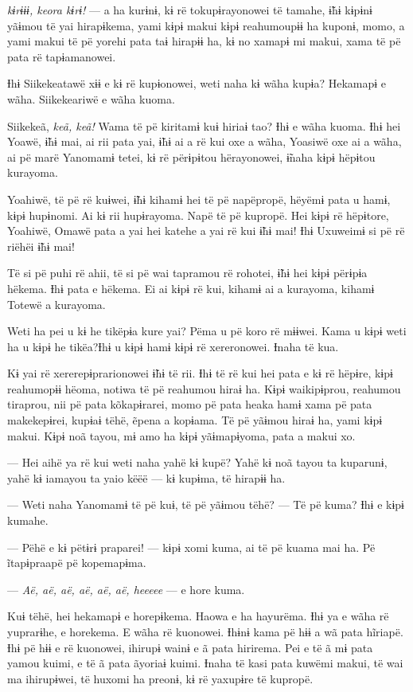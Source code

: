  \textit{kɨrɨɨɨ, keora kɨrɨ!} --- a ha kurɨnɨ, kɨ rë tokupɨrayonowei të
tamahe, ɨ̃hɨ kɨpɨnɨ yãɨmou të yai hirapɨkema, yami kɨpɨ makui kɨpɨ
reahumoupɨɨ ha kuponɨ, momo, a yami makui të pë yorehi pata taɨ hirapɨɨ
ha, kɨ no xamapɨ mi makui, xama të pë pata rë tapɨamanowei. 

Ɨhɨ Siikekeatawë xɨɨ e kɨ rë kupɨonowei, weti naha kɨ wãha kupɨa?
Hekamapɨ e wãha. Siikekeariwë e wãha kuoma. 

Siikekeã, \textit{keã, keã!} Wama të pë kiritamɨ kuɨ hiriaɨ tao? Ɨhɨ e wãha
kuoma. Ɨhɨ hei Yoawë, ɨ̃hɨ mai, ai rii pata yai, ɨ̃hɨ ai a rë kui oxe a
wãha, Yoasiwë oxe ai a wãha, ai pë marë Yanomamɨ tetei, kɨ rë përɨpɨtou
hërayonowei, ɨ̃naha kɨpɨ hëpɨtou kurayoma. 

Yoahiwë, të pë rë kuɨwei, ɨ̃hɨ kihamɨ hei të pë napëpropë, hëyëmɨ pata u
 hamɨ, kɨpɨ hupɨnomi. Ai kɨ rii hupɨrayoma. Napë të pë kupropë. Hei kɨpɨ
 rë hëpɨtore, Yoahiwë, Omawë pata a yai hei katehe a yai rë kui ɨ̃hɨ mai!
 Ɨhɨ Uxuweimɨ si pë rë riëhëi ɨ̃hɨ mai! 

Të si pë puhi rë ahii, të si pë wai tapramou rë rohotei, ɨ̃hɨ hei kɨpɨ
përɨpɨa hëkema. Ɨhɨ pata e hëkema. Ei ai kɨpɨ rë kui, kihamɨ ai a
kurayoma, kihamɨ Totewë a kurayoma. 

Weti ha pei u kɨ he tikëpɨa kure yai? Pëma u pë koro rë mɨɨwei. Kama u
kɨpɨ weti ha u kɨpɨ he tikëa?Ɨhɨ u kɨpɨ hamɨ kɨpɨ rë xereronowei. Ɨnaha
të kua. 

Kɨ yai rë xererepɨprarionowei ɨ̃hɨ të rii. Ɨhɨ të rë kui hei pata e kɨ rë
 hëpɨre, kɨpɨ reahumopɨɨ hëoma, notiwa të pë reahumou hiraɨ ha. Kɨpɨ
 waikipɨprou, reahumou tiraprou, nii pë pata kõkapɨrarei, momo pë pata
 heaka hamɨ xama pë pata makekepɨrei, kupɨaɨ tëhë, ẽpena a kopɨama. Të pë
 yãɨmou hiraɨ ha, yami kɨpɨ makui. Kɨpɨ noã tayou, mɨ amo ha kɨpɨ
 yãɨmapɨyoma, pata a makui xo. 

--- Hei aihë ya rë kui weti naha yahë kɨ kupë? Yahë kɨ noã tayou ta
kuparunɨ, yahë kɨ iamayou ta yaio këëë --- kɨ kupɨma, të hirapɨɨ ha. 

--- Weti naha Yanomamɨ të pë kuɨ, të pë yãɨmou tëhë? --- Të pë kuma? Ɨhɨ
e kɨpɨ kumahe. 

--- Pëhë e kɨ pëtɨrɨ praparei! --- kɨpɨ xomi kuma, ai të pë kuama mai
ha. Pë ĩtapɨpraapë pë kopemapɨma. 

--- \textit{Aë, aë, aë, aë, aë, aë, heeeee} --- e hore kuma. 

Kuɨ tëhë, hei hekamapɨ e horepɨkema. Haowa e ha hayurëma. Ɨhɨ ya e wãha
 rë yuprarɨhe, e horekema. E wãha rë kuonowei. Ɨhɨnɨ kama pë hɨɨ a wã
 pata hĩriapë. Ɨhɨ pë hɨɨ e rë kuonowei, ihirupɨ wainɨ e ã pata hirirema.
 Pei e të ã mɨ pata yamou kuimi, e të ã pata ãyoriaɨ kuimi. Ɨnaha të kasi
 pata kuwëmi makui, të wai ma ihirupɨwei, të huxomi ha preonɨ, kɨ rë
 yaxupɨre të kupropë.

